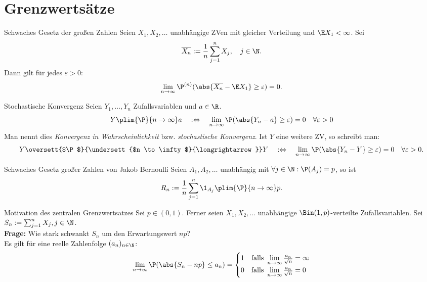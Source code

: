 \section*{Grenzwertsätze}

\begin{karte}{Schwaches Gesetz der großen Zahlen}
	Seien $X_1,X_2,\dotsc$ unabhängige ZVen mit gleicher Verteilung und $\E X_1 < \infty$. Sei 
	$$ \overline{X_n}:=\frac{1}{n}\sum_{j=1}^{n} X_j, \quad j \in \N.$$
	Dann gilt für jedes $\varepsilon > 0$:
	$$\lim\limits_{n \to \infty} \P^{(n)}(\abs{\overline{X_n}-\E X_1} \geq \varepsilon) = 0.$$
\end{karte}

\begin{karte}{Stochastische Konvergenz}
	Seien $Y_1,\dotsc ,Y_n$ Zufallsvariablen und $a \in \R$.
	$$ Y \plim{\P}{n \to \infty} a \quad :\Leftrightarrow \quad \lim\limits_{n \to \infty} 
	\P(\abs{Y_n-a}\geq \varepsilon) = 0 \quad \forall \varepsilon > 0$$
	Man nennt dies \textit{Konvergenz in Wahrscheinlichkeit} bzw. \textit{stochastische Konvergenz}.
	Ist $Y$ eine weitere ZV, so schreibt man:
	$$ Y \oversett{$\P$}{\undersett{$n \to \infty$}{\longrightarrow}} Y \quad :\Leftrightarrow 
	\quad \lim\limits_{n \to \infty} \P(\abs{Y_n-Y}\geq \varepsilon) = 0 \quad \forall \varepsilon > 0.$$
\end{karte}

\begin{karte}{Schwaches Gesetz großer Zahlen von Jakob Bernoulli}
	Seien $A_1,A_2,\dotsc$ unabhängig mit $\forall j \in \N :\P(A_j)=p$, so ist
	$$R_n := \frac{1}{n}\sum_{j=1}^{n}\1_{A_j} \plim{\P}{n \to \infty} p.$$
\end{karte}

\begin{karte}{Motivation des zentralen Grenzwertsatzes}
	Sei $p \in (0,1)$. Ferner seien $X_1,X_2,\dotsc$ unabhängige $\Bin(1,p)$-verteilte Zufallsvariablen. 
	Sei $S_n := \sum_{j=1}^{n}X_j, j \in \N$. \\
	\textbf{Frage:} Wie stark schwankt $S_n$ um den Erwartungswert $np$? \\
	Es gilt für eine reelle Zahlenfolge $(a_n)_{n \in \N}$:
	$$ \lim\limits_{n \to \infty}\P(\abs{S_n-np} \leq a_n) = \begin{cases}
	1 & \text{falls } \lim\limits_{n \to \infty} \frac{a_n}{\sqrt{n}} = \infty \\
	0 & \text{falls } \lim\limits_{n \to \infty} \frac{a_n}{\sqrt{n}} = 0
	\end{cases}$$
\end{karte}

